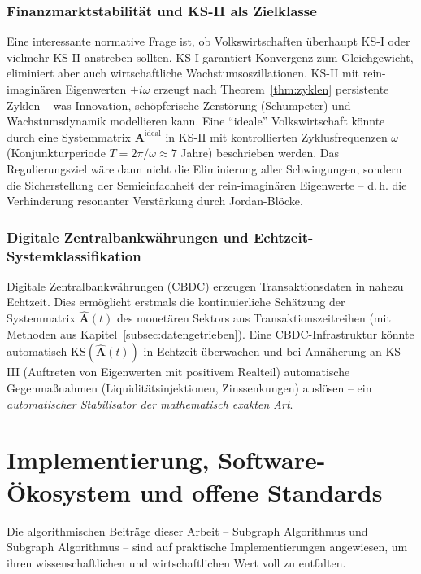﻿\documentclass[12pt, a4paper, titlepage]{report}
\theoremstyle{definition}
\theoremstyle{remark}
\newcommand{\vA}{\bm{A}}
\newcommand{\KS}{\mathrm{KS}}
\begin{document}
\subsubsection*{Finanzmarktstabilität und KS-II als Zielklasse}

Eine interessante normative Frage ist, ob Volkswirtschaften überhaupt KS-I oder
vielmehr KS-II anstreben sollten. KS-I garantiert Konvergenz zum Gleichgewicht,
eliminiert aber auch wirtschaftliche Wachstumsoszillationen. KS-II mit
rein-imaginären Eigenwerten $\pm i\omega$ erzeugt nach Theorem~\ref{thm:zyklen}
persistente Zyklen -- was Innovation, schöpferische Zerstörung (Schumpeter)
und Wachstumsdynamik modellieren kann. Eine ``ideale'' Volkswirtschaft könnte
durch eine Systemmatrix $\vA^{\mathrm{ideal}}$ in KS-II mit kontrollierten
Zyklusfrequenzen $\omega$ (Konjunkturperiode $T = 2\pi/\omega \approx 7$ Jahre)
beschrieben werden. Das Regulierungsziel wäre dann nicht die Eliminierung aller
Schwingungen, sondern die Sicherstellung der Semieinfachheit der rein-imaginären
Eigenwerte -- d.\,h. die Verhinderung resonanter Verstärkung durch Jordan-Blöcke.

\subsubsection*{Digitale Zentralbankwährungen und Echtzeit-Systemklassifikation}

Digitale Zentralbankwährungen (CBDC) erzeugen Transaktionsdaten in nahezu
Echtzeit. Dies ermöglicht erstmals die kontinuierliche Schätzung der
Systemmatrix $\hat{\vA}(t)$ des monetären Sektors aus Transaktionszeitreihen
(mit Methoden aus Kapitel~\ref{subsec:datengetrieben}). Eine CBDC-Infrastruktur
könnte automatisch $\KS(\hat{\vA}(t))$ in Echtzeit überwachen und bei
Annäherung an KS-III (Auftreten von Eigen\-werten mit positivem Realteil) automatische
Gegenmaßnahmen (Liquiditäts\-injektionen, Zinssenkungen) auslösen -- ein
\emph{automatischer Stabilisator der mathematisch exakten Art}.

\section{Implementierung, Software-Ökosystem und offene Standards}
\label{subsec:software}

Die algorithmischen Beiträge dieser Arbeit -- Subgraph Algorithmus und
Subgraph Algorithmus -- sind auf praktische Implementierungen angewiesen,
um ihren wissenschaftlichen und wirtschaftlichen Wert voll zu entfalten.
\end{document}

